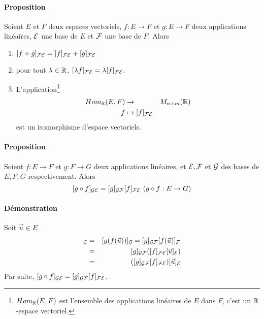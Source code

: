 \paragraph{Proposition} Soient $E$ et $F$ deux espaces vectoriels, $f: E \rightarrow F$ et $g: E \rightarrow F$ deux applications linéaires, $\mathcal{E}$ une base de $E$ et $\mathcal{F}$ une base de $F$. Alors
\begin{enumerate}
  \item $[f+ g]_{\mathcal{F} \mathcal{E}} = [f]_{\mathcal{F} \mathcal{E}} + [g]_{\mathcal{F} \mathcal{E}}$
  \item pour tout $\lambda \in \mathbb{R}$, $[\lambda f]_{\mathcal{F} \mathcal{E}} = \lambda [f]_{\mathcal{F} \mathcal{E}}$.
  \item L'application\footnote{$Hom_{\mathbb{R}}(E, F)$ est l'ensemble des applications linéaires de $E$ dans $F$, c'est un $\mathbb{R}$-espace vectoriel.}
    \begin{eqnarray*}
      Hom_{\mathbb{R}}(E, F) &\rightarrow& M_{n\times m}(\mathbb{R}) \\
      f &\mapsto [f]_{\mathcal{F} \mathcal{E}}
    \end{eqnarray*}
    est un isomorphisme d'espace vectoriels.
\end{enumerate}

\paragraph{Proposition} Soient $f: E \rightarrow F$ et $g: F \rightarrow G$ deux applications linéaires, et $\mathcal{E}, \mathcal{F}$ et $\mathcal{G}$ des bases de $E, F, G$ respectivement. Alors
$$[g \circ f]_{\mathcal{G} \mathcal{E}} = [g]_{\mathcal{G} \mathcal{F}} [f]_{\mathcal{F} \mathcal{E}} ~ (g \circ f: E \rightarrow G)$$

\paragraph{Démonstration} Soit $\vec{u} \in E$
\begin{eqnarray*}
  [(g \circ f)(\vec{u})]_{\cG} &=& [g(f(\vec{u}))]_{\cG} = [g]_{\cG \cF} [f(\vec{u})]_{\cF} \\
    &=& [g]_{\cG \cF} ([f]_{\cF \cE} [\vec{u}]_{\cE}) \\
    &=& ([g]_{\cG \cF} [f]_{\cF \cE}) [\vec{u}]_{\cE} 
\end{eqnarray*}
Par suite, $[g \circ f]_{\mathcal{G} \mathcal{E}} = [g]_{\mathcal{G} \mathcal{F}} [f]_{\mathcal{F} \mathcal{E}}$.

